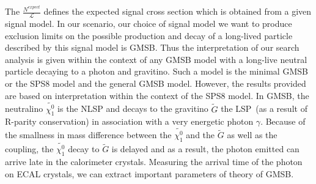 \paragraph*{}\mbox{}\\
The $\frac{N^{expect}}{\mathscr{L}}$ defines the expected signal cross section which is obtained from a given signal model. In our scenario, our choice of signal model we  want to produce exclusion limits on the possible production and decay of a long-lived particle described by this signal model is GMSB.
Thus the interpretation of our search analysis is given within the context of any GMSB model with a long-live neutral particle decaying to a photon and gravitino. Such a model is the minimal GMSB or the SPS8 model and the general GMSB model. However, the results provided are based on interpretation within the context of the SPS8 model.
In GMSB, the neutralino $\tilde{\chi^{0}_{1}}$ is the NLSP and decays to the gravitino $\tilde{G}$ the LSP~(as a result of R-parity conservation) in association with a very energetic photon $\gamma$. Because of the smallness in mass difference between the  $\tilde{\chi^{0}_{1}}$ and the $\tilde{G}$ as well as the coupling, the $\tilde{\chi^{0}_{1}}$ decay to $\tilde{G}$ is delayed and as a result, the photon emitted can arrive late in the calorimeter crystals.  Measuring the arrival time of the photon on ECAL crystals, we can extract important parameters of  theory of GMSB.

